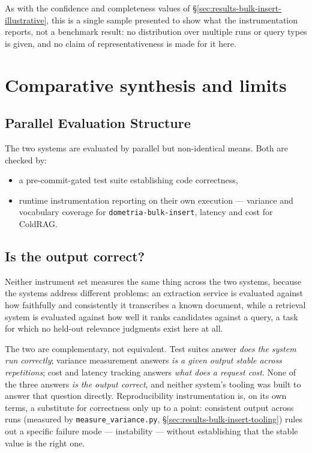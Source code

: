 As with the confidence and completeness values of \S\ref{sec:results-bulk-insert-illustrative}, this is a single sample presented to show what the instrumentation reports, not a benchmark result: no distribution over multiple runs or query types is given, and no claim of representativeness is made for it here.

\section{Comparative synthesis and limits}
\label{sec:results-synthesis}

\subsection{Parallel Evaluation Structure}
The two systems are evaluated by parallel but non-identical means. Both are checked by:

\begin{itemize}
\item a pre-commit-gated test suite establishing code correctness, 
\item runtime instrumentation reporting on their own execution — variance and vocabulary coverage for \texttt{dometria-bulk-insert}, latency and cost for ColdRAG. 
\end{itemize}

\subsection{Is the output correct?}
Neither instrument set measures the same thing across the two systems, because the systems address different problems: an extraction service is evaluated against how faithfully and consistently it transcribes a known document, while a retrieval system is evaluated against how well it ranks candidates against a query, a task for which no held-out relevance judgments exist here at all.


The two are complementary, not equivalent. Test suites answer \emph{does the system run correctly}; variance measurement answers \emph{is a given output stable across repetitions}; cost and latency tracking answers \emph{what does a request cost}. None of the three answers \emph{is the output correct}, and neither system's tooling was built to answer that question directly. Reproducibility instrumentation is, on its own terms, a substitute for correctness only up to a point: consistent output across runs (measured by \texttt{measure\_variance.py}, \S\ref{sec:results-bulk-insert-tooling}) rules out a specific failure mode — instability — without establishing that the stable value is the right one.


